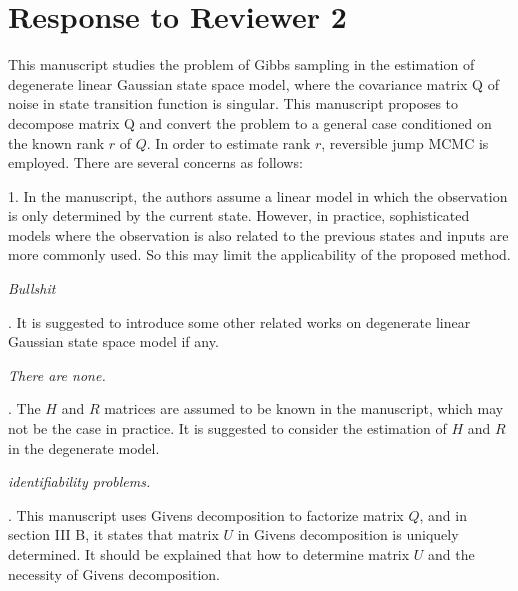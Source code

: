 \documentclass{article}
\newenvironment{review}[0]{\begin{itshape}\color{Gray}\noindent}{\end{itshape}\vspace{0.4cm}}
\newenvironment{response}[0]{\noindent}{\vspace{0.4cm}}
\newcommand{\meta}[1]{{\color{red}\em #1}}
\begin{document}
\section*{Response to Reviewer 2}

\begin{review}
This manuscript studies the problem of Gibbs sampling in the estimation of degenerate linear Gaussian state space model, where the covariance matrix Q of noise in state transition function is singular. This manuscript proposes to decompose matrix Q and convert the problem to a general case conditioned on the known rank $r$ of $Q$. In order to estimate rank $r$, reversible jump MCMC is employed. There are several concerns as follows:

1.  In the manuscript, the authors assume a linear model in which the observation is only determined by the current state. However, in practice, sophisticated models where the observation is also related to the previous states and inputs are more commonly used. So this may limit the applicability of the proposed method.
\end{review}

\begin{response}
 \meta{Bullshit}
\end{response}

\begin{review}
2.  It is suggested to introduce some other related works on degenerate linear Gaussian state space model if any.
\end{review}

\begin{response}
 \meta{There are none.}
\end{response}

\begin{review}
3.  The $H$ and $R$ matrices are assumed to be known in the manuscript, which may not be the case in practice. It is suggested to consider the estimation of $H$ and $R$ in the degenerate model.
\end{review}

\begin{response}
 \meta{identifiability problems.}
\end{response}

\begin{review}
4.  This manuscript uses Givens decomposition to factorize matrix $Q$, and in section III B, it states that matrix $U$ in Givens decomposition is uniquely determined. It should be explained that how to determine matrix $U$ and the necessity of Givens decomposition.
\end{review}
\end{document}
